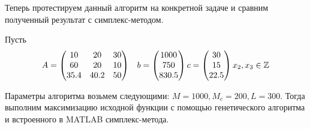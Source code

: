 \documentclass[../main.tex]{subfiles}
\begin{document}
	Теперь протестируем данный алгоритм на конкретной задаче и сравним полученный результат с симплекс-методом.
	
	Пусть 
	\[\begin{aligned}
		A &= \begin{pmatrix}
			10 & 20& 30 \\ 
			60 & 20& 10 \\ 
			35.4 & 40.2& 50 \\ 
		\end{pmatrix}
	\end{aligned} \\ 
		b = \begin{pmatrix}
		1000 \\
		750 \\
		830.5
	\end{pmatrix} \\
		c = \begin{pmatrix}
		30 \\
		15 \\ 
		22.5 \\
	\end{pmatrix} \\
	x_2, x_3 \in \mathbb{Z}\]
	
	Параметры алгоритма возьмем следующими: $M=1000, M_c = 200, L=300$. Тогда выполним максимизацию исходной функции с помощью генетического алгоритма и встроенного в MATLAB симплекс-метода.
	
\end{document}
